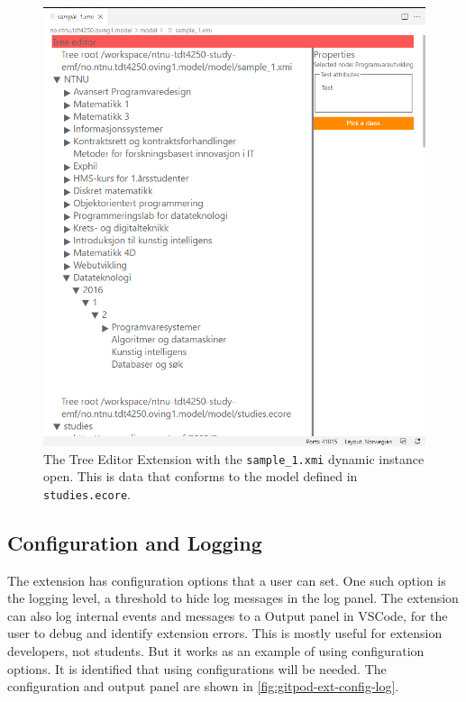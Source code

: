 \begin{figure}[H]  %
  \centering
  \includegraphics[width=\textwidth]{figures/gitpod-vscode-xmi-study-instance.png}
  \caption[Tree Editor Extension showing a dynamic instance]{The Tree Editor Extension with the \texttt{sample\_1.xmi} dynamic instance open. This is data that conforms to the model defined in \texttt{studies.ecore}.}\label{fig:gitpod-ext-dynamic}
\end{figure}


\subsection{Configuration and Logging}

The extension has configuration options that a user can set.
One such option is the logging level, a threshold to hide log messages in the log panel.
The extension can also log internal events and messages to a Output panel in \gls{VSCode}, for the user to debug and identify extension errors.
This is mostly useful for extension developers, not students.
But it works as an example of using configuration options.
It is identified that using configurations will be needed.
The configuration and output panel are shown in \cref{fig:gitpod-ext-config-log}.


